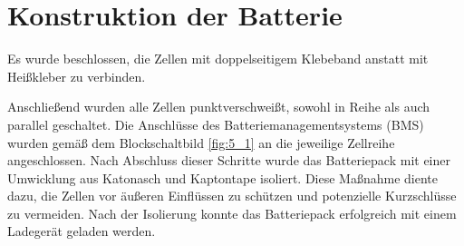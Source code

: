 







\section{Konstruktion der Batterie}

Es wurde beschlossen, die Zellen mit doppelseitigem Klebeband anstatt mit Heißkleber zu verbinden.


Anschließend wurden alle Zellen punktverschweißt, sowohl in Reihe als auch parallel geschaltet.
Die Anschlüsse des Batteriemanagementsystems (BMS) wurden gemäß dem Blockschaltbild \ref{fig:5_1} an die jeweilige Zellreihe angeschlossen.
Nach Abschluss dieser Schritte wurde das Batteriepack mit einer Umwicklung aus Katonasch und Kaptontape isoliert.
Diese Maßnahme diente dazu, die Zellen vor äußeren Einflüssen zu schützen und potenzielle Kurzschlüsse zu vermeiden.
Nach der Isolierung konnte das Batteriepack erfolgreich mit einem Ladegerät geladen werden.


